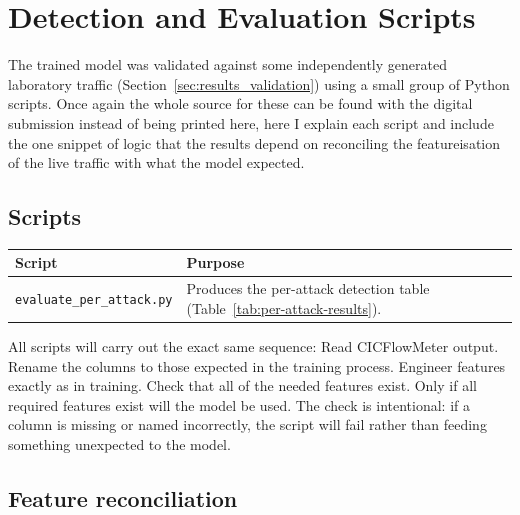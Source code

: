 
\chapter{Detection and Evaluation Scripts}
\label{app:scripts}

The trained model was validated against some independently generated laboratory traffic (Section~\ref{sec:results_validation}) using a small group of Python scripts. Once again the whole source for these can be found with the digital submission instead of being printed here, here I explain each script and include the one snippet of logic that the results depend on  reconciling the featureisation of the live traffic with what the model expected.

\section{Scripts}
\label{app:scripts_list}

\begin{center}
\begin{tabular}{ll}
  \toprule
  \textbf{Script} & \textbf{Purpose} \\
  \midrule
  \texttt{evaluate\_per\_attack.py}   & Produces the per-attack detection table (Table~\ref{tab:per-attack-results}). \\
  \bottomrule
\end{tabular}
\end{center}

All scripts will carry out the exact same sequence: Read CICFlowMeter output. Rename the columns to those expected in the training process. Engineer features exactly as in training.
Check that all of the needed features exist.
Only if all required features exist will the model be used. The check is intentional: if a column is missing or named incorrectly, the script will fail rather than feeding something unexpected to the model.

\section{Feature reconciliation}
\label{app:scripts_excerpt}

